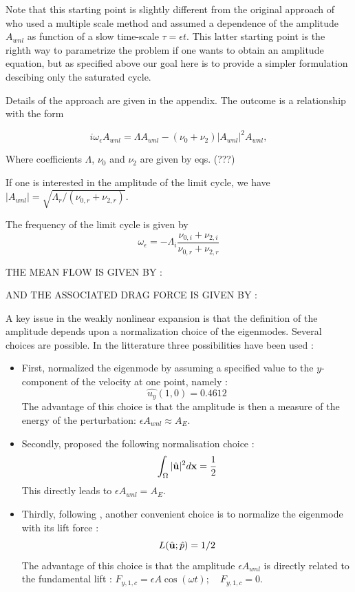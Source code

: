 \documentclass[twocolumn,10pt]{asme2ej}
\newcommand{\be}[1]{ \begin{equation} \label{#1}}
\newcommand{\ee}{\end{equation}}
\begin{document}
Note that this starting point is slightly different from the original approach of \cite{SippLebedev} who used a multiple scale method and assumed a dependence of the amplitude $A_{wnl}$ as function of a slow time-scale $\tau = \epsilon t$. This latter starting point is the righth way to parametrize the problem if one wants to obtain an amplitude equation, but as specified above our goal here is to provide a simpler formulation descibing only the saturated cycle. 

Details of the approach are given in the appendix. The outcome is a relationship with the form 


\be{WNL3}
i \omega_\epsilon A_{wnl} = \Lambda A_{wnl} - (\nu_0+\nu_2)  |A_{wnl}|^2 A_{wnl},
\ee


Where coefficients $\Lambda$, $\nu_0$ and $\nu_2$ are given by eqs. (???)

If one is interested in the amplitude of the limit cycle, we have 
$|A_{wnl}| = \sqrt{\Lambda_r/(\nu_{0,r}+\nu_{2,r})}$.


The frequency of the limit cycle is given by
\be{omegaWNL} 
\omega_\epsilon =  - \Lambda_i \frac{\nu_{0,i}+\nu_{2,i} }{\nu_{0,r}+\nu_{2,r} } 
\ee


THE MEAN FLOW IS GIVEN BY :

AND THE ASSOCIATED DRAG FORCE IS GIVEN BY :


{\color{blue}
A key issue in the weakly nonlinear expansion is that the definition of the amplitude depends upon a normalization choice 
of the eigenmodes. Several choices are possible. In the litterature three possibilities have been used :
\begin{itemize}
\item First, \cite{SippLebedev} normalized the eigenmode by assuming a specified value to the $y$-component of the velocity at one point, namely :
\be{normsipp}
\hat{u_y}(1,0) = 0.4612
\ee
The advantage of this choice is that the amplitude is then a measure of the energy of the perturbation: 
$\epsilon A_{wnl} \approx A_E$.

\item Secondly, \cite{FDR2016} proposed the following normalisation choice :
\be{normFDR}
\int_\Omega |\hat{\bf u}|^2 d {\bf x}  = \frac{1}{2}
\ee
This directly leads to $\epsilon A_{wnl} = A_E$.

\item Thirdly, following \cite{Fabre2012}, another convenient choice is to normalize the eigenmode with its lift 
force : 
\be{normfabre}
L(\hat{\bf u};\hat{p}) = 1/2
\ee
The advantage of this choice is that the amplitude $\epsilon A_{wnl}$ is directly related to the fundamental lift :
$
F_{y,1,c} 
=   \epsilon A \cos (\omega t) ; \quad F_{y,1,c} = 0. 
$

\end{itemize}
}
\end{document}
